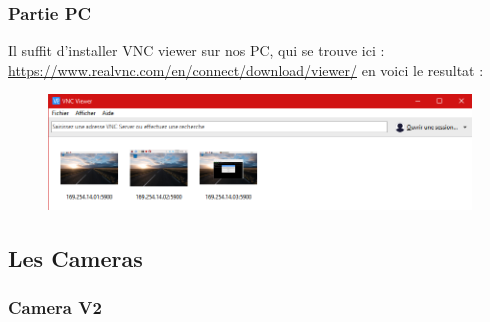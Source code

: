 \documentclass[a4paper,11pt]{report}
\begin{document}
			\subsubsection{Partie PC}
			Il suffit d'installer VNC viewer sur nos PC, qui se trouve ici :
			\url{https://www.realvnc.com/en/connect/download/viewer/}
			\newline en voici le resultat :
			\begin{figure}[!h]
				\begin{center}
					\includegraphics[scale=0.5]{Illustrations/6.png}
				\end{center}
			\end{figure}
			
		\subsection{Les Cameras}
		
		\subsubsection{Camera V2}
		
\end{document}
